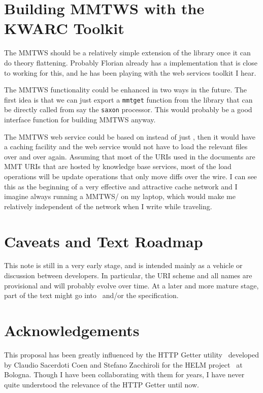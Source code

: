 \documentclass[12pt]{article}
\begin{document}
\section{Building MMTWS with the KWARC Toolkit}

The MMTWS should be a relatively simple extension of the {\jomdoc} library once it can do
theory flattening. Probably Florian already has a {\scala} implementation that is close to
working for this, and he has been playing with the {\scala} web services toolkit I hear. 

The MMTWS functionality could be enhanced in two ways in the future. The first idea is
that we can just export a {\texttt{mmtget}} function from the {\jomdoc} library that can
be directly called from say the {\texttt{saxon}} {\xslt} processor. This would probably be
a good interface function for building MMTWS anyway. 

The MMTWS web service could be based on {\ombase} instead of just {\jomdoc}, then it would
have a caching facility and the web service would not have to load the relevant files over
and over again. Assuming that most of the URIs used in the {\omdoc} documents are MMT URIs
that are hosted by {\ombase} knowledge base services, most of the load operations will be
{\svn} update operations that only move diffs over the wire. I can see this as the
beginning of a very effective and attractive {\ombase} cache network and I imagine always
running a MMTWS/{\ombase} on my laptop, which would make me relatively independent of the
network when I write {\omdoc} while traveling. 

\section{Caveats and Text Roadmap}

This note is still in a very early stage, and is intended mainly as a vehicle or
discussion between {\omdoc} developers. In particular, the URI scheme and all names are
provisional and will probably evolve over time. At a later and more mature stage, part of
the text might go into~\cite{RabKoh:WSMSML08} and/or the {} specification.

\section{Acknowledgements}
This proposal has been greatly influenced by the HTTP Getter utility~\cite{getter:webpage}
developed by Claudio Sacerdoti Coen and Stefano Zacchiroli for the HELM
project~\cite{AspPad:hsmw01} at Bologna. Though I have been collaborating with them for
years, I have never quite understood the relevance of the HTTP Getter until now.

 

\end{document}
